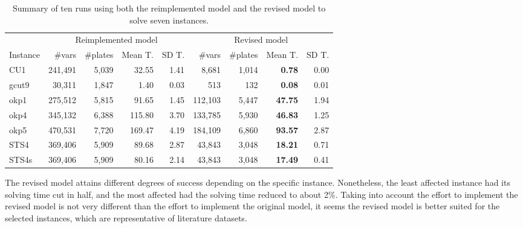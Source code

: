 \begin{table}
\caption{Summary of ten runs using both the reimplemented model and the revised model to solve seven instances.}
\setlength\tabcolsep{2.5px}
\def\arraystretch{1.1}
\begin{tabular}{@{\extracolsep{4pt}}lrrrrrrrr@{}}
& \multicolumn{4}{c}{Reimplemented model} & \multicolumn{4}{c}{Revised model}\\
\cline{2-5}\cline{6-9}
Instance & \#vars & \#plates & Mean T. & SD T. & \#vars & \#plates & Mean T. & SD T.\\
\hline
CU1 & 241,491 & 5,039 & 32.55 & 1.41 & 8,681 & 1,014 & \bf{0.78} & 0.00 \\
gcut9 & 30,311 & 1,847 & 1.40 & 0.03 & 513 & 132 & \bf{0.08} & 0.01 \\
okp1 & 275,512 & 5,815 & 91.65 & 1.45 & 112,103 & 5,447 & \bf{47.75} & 1.94 \\
okp4 & 345,132 & 6,388 & 115.80 & 3.70 & 133,785 & 5,930 & \bf{46.83} & 1.25 \\
okp5 & 470,531 & 7,720 & 169.47 & 4.19 & 184,109 & 6,860 & \bf{93.57} & 2.87 \\
STS4 & 369,406 & 5,909 & 89.68 & 2.87 & 43,843 & 3,048 & \bf{18.21} & 0.71 \\
STS4s & 369,406 & 5,909 & 80.16 & 2.14 & 43,843 & 3,048 & \bf{17.49} & 0.41 \\
\hline
\end{tabular}
\label{tab:seven_instances}
\end{table}

The revised model attains different degrees of success depending on the specific instance.
Nonetheless, the least affected instance had its solving time cut in half, and the most affected had the solving time reduced to about 2\%.
Taking into account the effort to implement the revised model is not very different than the effort to implement the original model, it seems the revised model is better suited for the selected instances, which are representative of literature datasets.

